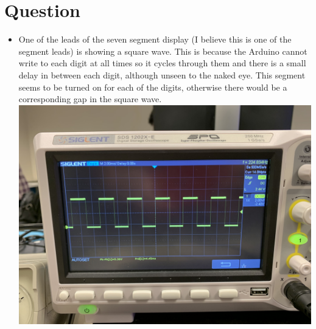 \documentclass[]{article}
\begin{document}
\section*{Question}
\begin{itemize}
	\item One of the leads of the seven segment display (I believe this is one of the segment leads) is showing a square wave. This is because the Arduino cannot write to each digit at all times so it cycles through them and there is a small delay in between each digit, although unseen to the naked eye. This segment seems to be turned on for each of the digits, otherwise there would be a corresponding gap in the square wave.
		\includegraphics[width=\textwidth]{ ./images/3.jpg }
\end{itemize}
\end{document}
